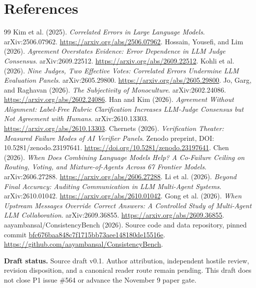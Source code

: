 \documentclass[11pt]{article}
\begin{document}
\section{References}
\begin{thebibliography}{99}
 Kim et al. (2025). \emph{Correlated Errors in Large Language Models}. arXiv:2506.07962. \url{https://arxiv.org/abs/2506.07962}.
 Hossain, Yousefi, and Lim (2026). \emph{Agreement Overstates Evidence: Error Dependence in LLM Judge Consensus}. arXiv:2609.22512. \url{https://arxiv.org/abs/2609.22512}.
 Kohli et al. (2026). \emph{Nine Judges, Two Effective Votes: Correlated Errors Undermine LLM Evaluation Panels}. arXiv:2605.29800. \url{https://arxiv.org/abs/2605.29800}.
 Jo, Garg, and Raghavan (2026). \emph{The Subjectivity of Monoculture}. arXiv:2602.24086. \url{https://arxiv.org/abs/2602.24086}.
 Han and Kim (2026). \emph{Agreement Without Alignment: Label-Free Rubric Clarification Increases LLM-Judge Consensus but Not Agreement with Humans}. arXiv:2610.13303. \url{https://arxiv.org/abs/2610.13303}.
 Chernets (2026). \emph{Verification Theater: Measured Failure Modes of AI Verifier Panels}. Zenodo preprint, DOI: 10.5281/zenodo.23197641. \url{https://doi.org/10.5281/zenodo.23197641}.
 Chen (2026). \emph{When Does Combining Language Models Help? A Co-Failure Ceiling on Routing, Voting, and Mixture-of-Agents Across 67 Frontier Models}. arXiv:2606.27288. \url{https://arxiv.org/abs/2606.27288}.
 Li et al. (2026). \emph{Beyond Final Accuracy: Auditing Communication in LLM Multi-Agent Systems}. arXiv:2610.01042. \url{https://arxiv.org/abs/2610.01042}.
 Gong et al. (2026). \emph{When Upstream Messages Override Correct Answers: A Controlled Study of Multi-Agent LLM Collaboration}. arXiv:2609.36855. \url{https://arxiv.org/abs/2609.36855}.
 aayambansal/ConsistencyBench (2026). Source code and data repository, pinned commit \url{bfc676baa848c7f1715bb73aee148180de15516e}. \url{https://github.com/aayambansal/ConsistencyBench}.
\end{thebibliography}

\vspace{1em}
\textbf{Draft status.} Source draft v0.1. Author attribution, independent hostile review, revision disposition, and a canonical reader route remain pending. This draft does not close P1 issue \#564 or advance the November 9 paper gate.
\end{document}
